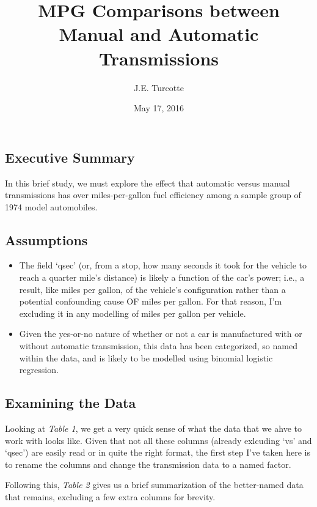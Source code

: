 \documentclass[]{article}
\title{MPG Comparisons between Manual and Automatic Transmissions}
\author{J.E. Turcotte}
\date{May 17, 2016}
\begin{document}
\maketitle


\subsection{Executive Summary}\label{executive-summary}

In this brief study, we must explore the effect that automatic versus
manual transmissions has over miles-per-gallon fuel efficiency among a
sample group of 1974 model automobiles.

\subsection{Assumptions}\label{assumptions}

\begin{itemize}
\itemsep1pt\parskip0pt
\item
  The field `qsec' (or, from a stop, how many seconds it took for the
  vehicle to reach a quarter mile's distance) is likely a function of
  the car's power; i.e., a result, like miles per gallon, of the
  vehicle's configuration rather than a potential confounding cause OF
  miles per gallon. For that reason, I'm excluding it in any modelling
  of miles per gallon per vehicle.
\item
  Given the yes-or-no nature of whether or not a car is manufactured
  with or without automatic transmission, this data has been
  categorized, so named within the data, and is likely to be modelled
  using binomial logistic regression.
\end{itemize}

\subsection{Examining the Data}\label{examining-the-data}

Looking at \emph{Table 1}, we get a very quick sense of what the data
that we ahve to work with looks like. Given that not all these columns
(already exlcuding `vs' and `qsec') are easily read or in quite the
right format, the first step I've taken here is to rename the columns
and change the transmission data to a named factor.

Following this, \emph{Table 2} gives us a brief summarization of the
better-named data that remains, excluding a few extra columns for
brevity.
\end{document}
